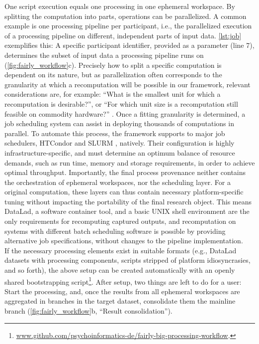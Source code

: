 One script execution equals one processing in one ephemeral workspace.
By splitting the computation into parts, operations can be parallelized.
A common example is one processing pipeline per participant, i.e., the parallelized execution of a processing pipeline on different, independent parts of input data.
\cref{lst:job} exemplifies this: A specific participant identifier, provided as a parameter (line 7), determines the subset of input data a processing pipeline runs on (\cref{fig:fairly_workflow}c).
Precisely how to split a specific computation is dependent on its nature, but as parallelization often corresponds to the granularity at which a recomputation will be possible in our framework, relevant considerations are, for example: ``What is the smallest unit for which a recomputation is desirable?'', or ``For which unit size is a recomputation still feasible on commodity hardware?'' \citep{wagner2022fairly}.
Once a fitting granularity is determined, a job scheduling system can assist in deploying thousands of computations in parallel.
To automate this process, the framework supports to major job schedulers, HTCondor \citep{thain2005distributed} and SLURM \citep{yoo2003slurm}, natively.
Their configuration is highly infrastructure-specific, and must determine an optimum balance of resource demands, such as run time, memory and storage requirements, in order to achieve optimal throughput.
Importantly, the final process provenance neither contains the orchestration of ephemeral workspaces, nor the scheduling layer.
For a original computation, these layers can thus contain necessary platform-specific tuning without impacting the portability of the final research object.
This means DataLad, a software container tool, and a basic UNIX shell environment are the only requirements for recomputing captured outputs, and recomputation on systems with different batch scheduling software is possible by providing alternative job specifications, without changes to the pipeline implementation.\\
If the necessary processing elements exist in suitable formats (e.g., DataLad datasets with processing components, scripts stripped of platform idiosyncrasies, and so forth), the above setup can be created automatically with an openly shared bootstrapping script\footnote{\url{www.github.com/psychoinformatics-de/fairly-big-processing-workflow}.}.
After setup, two things are left to do for a user:
Start the processing, and, once the results from all ephemeral workspaces are aggregated in branches in the target dataset, consolidate them the mainline branch (\cref{fig:fairly_workflow}b, ``Result consolidation'').
